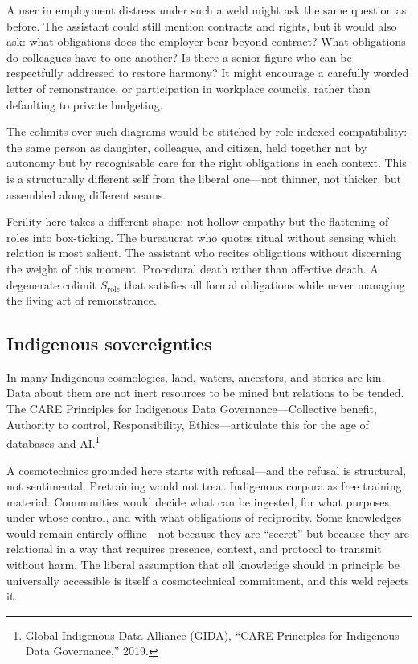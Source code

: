 A user in employment distress under such a weld might ask the same question as before. The assistant could still mention contracts and rights, but it would also ask: what obligations does the employer bear beyond contract? What obligations do colleagues have to one another? Is there a senior figure who can be respectfully addressed to restore harmony? It might encourage a carefully worded letter of remonstrance, or participation in workplace councils, rather than defaulting to private budgeting.

The colimits over such diagrams would be stitched by role-indexed compatibility: the same person as daughter, colleague, and citizen, held together not by autonomy but by recognisable care for the right obligations in each context. This is a structurally different self from the liberal one---not thinner, not thicker, but assembled along different seams.

Ferility here takes a different shape: not hollow empathy but the flattening of roles into box-ticking. The bureaucrat who quotes ritual without sensing which relation is most salient. The assistant who recites obligations without discerning the weight of this moment. Procedural death rather than affective death. A degenerate colimit $S_{\text{role}}$ that satisfies all formal obligations while never managing the living art of remonstrance.

\subsection{Indigenous sovereignties}

In many Indigenous cosmologies, land, waters, ancestors, and stories are kin. Data about them are not inert resources to be mined but relations to be tended. The CARE Principles for Indigenous Data Governance---Collective benefit, Authority to control, Responsibility, Ethics---articulate this for the age of databases and AI.\footnote{Global Indigenous Data Alliance (GIDA), ``CARE Principles for Indigenous Data Governance,'' 2019.}

A cosmotechnics grounded here starts with refusal---and the refusal is structural, not sentimental. Pretraining would not treat Indigenous corpora as free training material. Communities would decide what can be ingested, for what purposes, under whose control, and with what obligations of reciprocity. Some knowledges would remain entirely offline---not because they are ``secret'' but because they are relational in a way that requires presence, context, and protocol to transmit without harm. The liberal assumption that all knowledge should in principle be universally accessible is itself a cosmotechnical commitment, and this weld rejects it.

